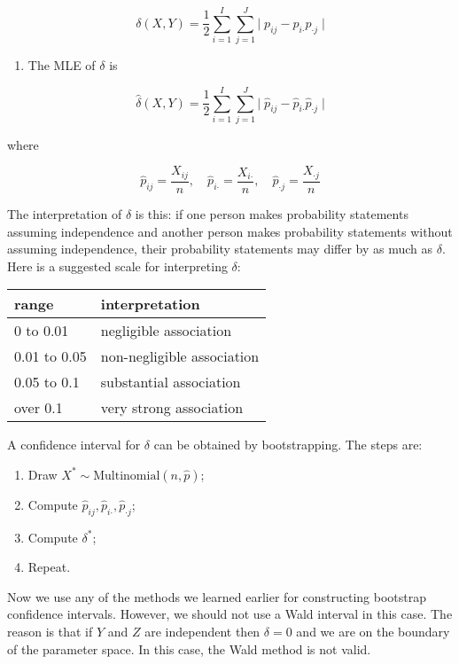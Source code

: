 \[ \delta(X, Y) = \frac{1}{2} \sum_{i=1}^I \sum_{j=1}^J \Big|\; p_{ij} - p_{i\text{·}} p_{\text{·}j} \;\Big|\]

\begin{enumerate}[tightlist,label={\arabic*.},resume]
\item
  The MLE of \(\delta\) is
\end{enumerate}

\[ \hat{\delta}(X, Y) = \frac{1}{2} \sum_{i=1}^I \sum_{j=1}^J \Big|\; \hat{p}_{ij} - \hat{p}_{i\text{·}} \hat{p}_{\text{·}j} \;\Big|\]

where

\[
\hat{p}_{ij} = \frac{X_{ij}}{n},
\quad \hat{p}_{i\text{·}} = \frac{X_{i\text{·}}}{n},
\quad \hat{p}_{\text{·}j} = \frac{X_{\text{·}j}}{n}
\]

The interpretation of \(\delta\) is this: if one person makes
probability statements assuming independence and another person makes
probability statements without assuming independence, their probability
statements may differ by as much as \(\delta\). Here is a suggested scale
for interpreting \(\delta\):

\begin{tabular}{@{}ll@{}}
\toprule
range & interpretation \\
\midrule
0 to 0.01 & negligible association \\
0.01 to 0.05 & non-negligible association \\
0.05 to 0.1 & substantial association \\
over 0.1 & very strong association \\
\bottomrule
\end{tabular}

A confidence interval for \(\delta\) can be obtained by bootstrapping.
The steps are:

\begin{enumerate}[tightlist,label={\arabic*.}]
\item
  Draw \(X^* \sim \text{Multinomial}(n, \hat{p})\);
\item
  Compute \(\hat{p}_{ij}, \hat{p}_{i\text{·}}, \hat{p}_{\text{·}j}\);
\item
  Compute \(\delta^*\);
\item
  Repeat.
\end{enumerate}

Now we use any of the methods we learned earlier for constructing
bootstrap confidence intervals. However, we should not use a Wald
interval in this case. The reason is that if \(Y\) and \(Z\) are
independent then \(\delta = 0\) and we are on the boundary of the
parameter space. In this case, the Wald method is not valid.

